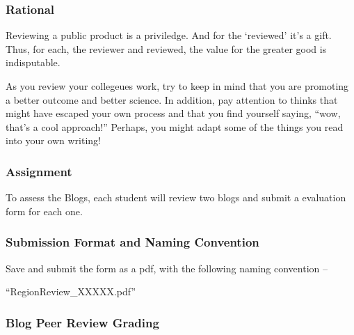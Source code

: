 
\subsubsection{Rational}

Reviewing a public product is a priviledge. And for the `reviewed' it's a gift. Thus, for each, the reviewer and reviewed, the value for the greater good is indisputable. 

As you review your collegeues work, try to keep in mind that you are promoting a better outcome and better science. In addition, pay attention to thinks that might have escaped your own process and that you find yourself saying, ``wow, that's a cool approach!''  Perhaps, you might adapt some of the things you read into your own writing!

\subsubsection{Assignment}

To assess the Blogs, each student will review two blogs and submit a evaluation form for each one. 

\subsubsection{Submission Format and Naming Convention}

Save and submit the form as a pdf, with the following naming convention -- 

``RegionReview\_XXXXX.pdf''

\subsubsection{Blog Peer Review Grading}



